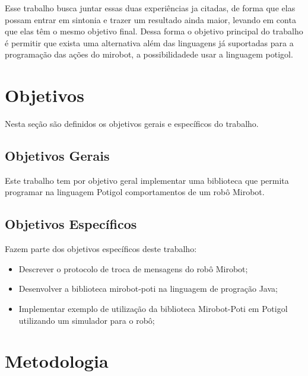 Esse trabalho busca juntar essas duas experiências ja citadas, de forma que
elas possam entrar em sintonia e trazer um resultado ainda maior, levando em
conta que elas têm o mesmo objetivo final. Dessa forma o objetivo principal do
trabalho é permitir que exista uma alternativa além das linguagens já
suportadas para a programação das ações do mirobot, a possibilidadede usar a
linguagem potigol.

\section{Objetivos}

Nesta seção são definidos os objetivos gerais e específicos do trabalho.

\subsection{Objetivos Gerais}

Este trabalho tem por objetivo geral implementar uma biblioteca que permita
programar na linguagem Potigol comportamentos de um robô Mirobot.

\subsection{Objetivos Específicos}

Fazem parte dos objetivos específicos deste trabalho:

\begin{itemize} \item Descrever o protocolo de troca de mensagens do robô
    Mirobot; \item Desenvolver a biblioteca mirobot-poti na linguagem de
    progração Java; \item Implementar exemplo de utilização da biblioteca
      Mirobot-Poti em Potigol utilizando um simulador para o robô;
\end{itemize}


\section{Metodologia}

